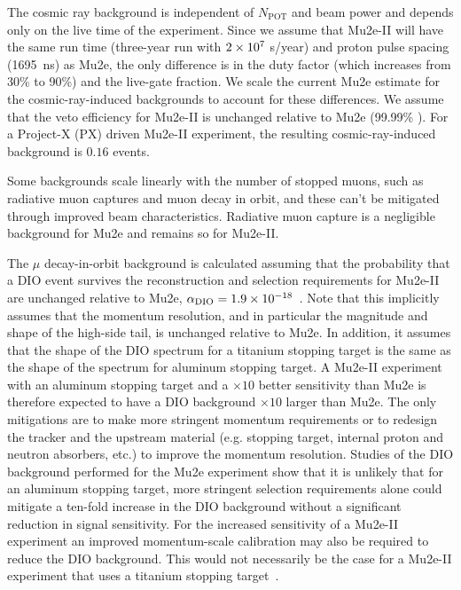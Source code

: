 The cosmic ray background is independent of $N_{\mathrm{POT}}$ and
beam power and depends only on the live time of the experiment. Since
we assume that Mu2e-II will have the same run time (three-year run
with $2\times10^{7}$ s/year) and proton pulse spacing (1695~ns) as Mu2e,
the only difference is in the duty factor (which increases from 30\%
to 90\%) and the live-gate fraction. We scale the current Mu2e
estimate for the cosmic-ray-induced backgrounds to account for these
differences.  We assume that the veto efficiency for Mu2e-II is
unchanged relative to Mu2e (99.99\% ). For a Project-X (PX) driven
Mu2e-II experiment, the resulting cosmic-ray-induced background is
$0.16$ events.

Some backgrounds scale linearly with the number of stopped muons, such
as radiative muon captures and muon decay in orbit, and these can't be
mitigated through improved beam characteristics.  Radiative muon
capture is a negligible background for Mu2e and remains so for
Mu2e-II.

The $\mu$ decay-in-orbit background is calculated assuming that the
probability that a DIO event survives the reconstruction and selection
requirements for Mu2e-II are unchanged relative to Mu2e,
$\alpha_{\mathrm{DIO}} = 1.9\times10^{-18}$~\cite{Mu2eCDR}.  Note that
this implicitly assumes that the momentum resolution, and in
particular the magnitude and shape of the high-side tail, is unchanged
relative to Mu2e. In addition, it assumes that the shape of the DIO
spectrum for a titanium stopping target is the same as the shape of
the spectrum for aluminum stopping target.  A Mu2e-II experiment with
an aluminum stopping target and a $\times 10$ better sensitivity than
Mu2e is therefore expected to have a DIO background $\times 10$ larger
than Mu2e.  The only mitigations are to make more stringent momentum
requirements or to redesign the tracker and the upstream material
(e.g. stopping target, internal proton and neutron absorbers, etc.) to
improve the momentum resolution.  Studies of the DIO background
performed for the Mu2e experiment show that it is unlikely that for an
aluminum stopping target, more stringent selection requirements alone
could mitigate a ten-fold increase in the DIO background without a
significant reduction in signal sensitivity.  For the increased
sensitivity of a Mu2e-II experiment an improved momentum-scale
calibration may also be required to reduce the DIO background.  This
would not necessarily be the case for a Mu2e-II experiment that uses a
titanium stopping target~\cite{DIOComment}.

